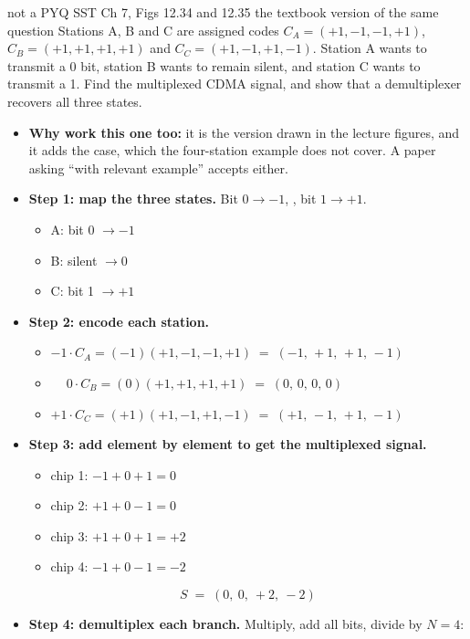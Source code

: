\begin{asked}[PROBLEM]{not a PYQ \textperiodcentered{} SST Ch 7, Figs 12.34 and 12.35 \textperiodcentered{} the textbook version of the same question}
Stations A, B and C are assigned codes $C_A = (+1,-1,-1,+1)$, $C_B = (+1,+1,+1,+1)$ and
$C_C = (+1,-1,+1,-1)$. Station A wants to transmit a 0 bit, station B wants to remain silent,
and station C wants to transmit a 1. Find the multiplexed CDMA signal, and show that a
demultiplexer recovers all three states.
\end{asked}

\begin{itemize}
  \item \textbf{Why work this one too:} it is the version drawn in the lecture figures, and it
        adds the  case, which the four-station example does not cover. A
        paper asking ``with relevant example'' accepts either.
  \item \textbf{Step 1: map the three states.} Bit $0 \rightarrow -1$,
        , bit $1 \rightarrow +1$.
  \begin{itemize}
    \item A: bit 0 $\rightarrow -1$ \; \item B: silent $\rightarrow 0$ \;
    \item C: bit 1 $\rightarrow +1$
  \end{itemize}
  \item \textbf{Step 2: encode each station.}
  \begin{itemize}
    \item $-1 \cdot C_A = (-1)(+1,-1,-1,+1) \;=\; (-1,\,+1,\,+1,\,-1)$
    \item $\phantom{-}0 \cdot C_B = (0)(+1,+1,+1,+1) \;=\; (0,\,0,\,0,\,0)$
          \; 
    \item $+1 \cdot C_C = (+1)(+1,-1,+1,-1) \;=\; (+1,\,-1,\,+1,\,-1)$
  \end{itemize}
  \item \textbf{Step 3: add element by element to get the multiplexed signal.}
  \begin{itemize}
    \item chip 1: $-1 + 0 + 1 = 0$ \; \item chip 2: $+1 + 0 - 1 = 0$
    \item chip 3: $+1 + 0 + 1 = +2$ \; \item chip 4: $-1 + 0 - 1 = -2$
  \end{itemize}
        \[ S \;=\; (0,\ 0,\ +2,\ -2) \]
  \item \textbf{Step 4: demultiplex each branch.} Multiply, add all bits, divide by $N = 4$:
\end{itemize}
